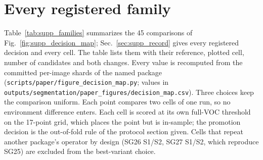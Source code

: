 \section{Every registered family}
\label{sec:supp_packages}
Table~\ref{tab:supp_families} summarizes the 45 comparisons of Fig.~\ref{fig:supp_decision_map}; Sec.~\ref{sec:supp_record} gives every registered decision and every cell. The table lists them with their reference, plotted cell, number of candidates and both changes. Every value is recomputed from the committed per-image shards of the named package (\texttt{scripts/\allowbreak{}paper/\allowbreak{}figure\_\allowbreak{}decision\_\allowbreak{}map.py}; values in \texttt{outputs/\allowbreak{}segmentation/\allowbreak{}paper\_\allowbreak{}figures/\allowbreak{}decision\_\allowbreak{}map.csv}). Three choices keep the comparison uniform. Each point compares two cells of one run, so no environment difference enters. Each cell is scored at its own full-VOC threshold on the 17-point grid, which places the point but is in-sample; the promotion decision is the out-of-fold rule of the protocol section given. Cells that repeat another package's operator by design (SG26 S1/S2, SG27 S1/S2, which reproduce SG25) are excluded from the best-variant choice.



